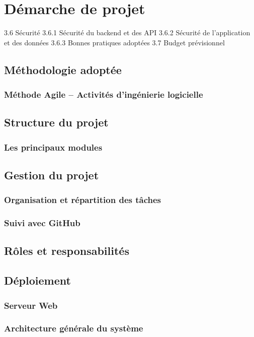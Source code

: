 \chapter{Démarche de projet}

3.6 Sécurité
3.6.1 Sécurité du backend et des API
3.6.2 Sécurité de l’application et des données
3.6.3 Bonnes pratiques adoptées
3.7 Budget prévisionnel

\section{Méthodologie adoptée }
\subsection{Méthode Agile – Activités d’ingénierie logicielle}

\section{Structure du projet}
\subsection{Les principaux modules}

\section{Gestion du projet}
\subsection{Organisation et répartition des tâches}
\subsection{Suivi avec GitHub}

\section{Rôles et responsabilités}
\section{Déploiement}
\subsection{Serveur Web}
\subsection{Architecture générale du système}
